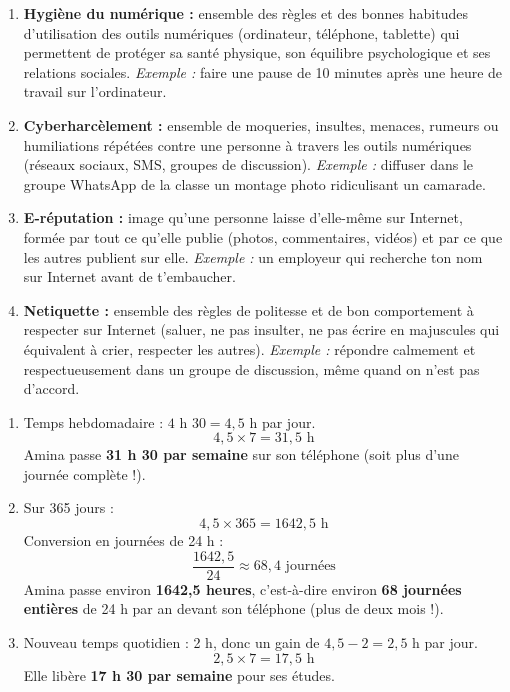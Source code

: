 \documentclass[11pt]{article}
\begin{document}
\begin{corrige}
\begin{enumerate}
\item \textbf{Hygiène du numérique :} ensemble des règles et des bonnes habitudes d'utilisation des outils numériques (ordinateur, téléphone, tablette) qui permettent de protéger sa santé physique, son équilibre psychologique et ses relations sociales. \emph{Exemple :} faire une pause de 10 minutes après une heure de travail sur l'ordinateur.
\item \textbf{Cyberharcèlement :} ensemble de moqueries, insultes, menaces, rumeurs ou humiliations répétées contre une personne à travers les outils numériques (réseaux sociaux, SMS, groupes de discussion). \emph{Exemple :} diffuser dans le groupe WhatsApp de la classe un montage photo ridiculisant un camarade.
\item \textbf{E-réputation :} image qu'une personne laisse d'elle-même sur Internet, formée par tout ce qu'elle publie (photos, commentaires, vidéos) et par ce que les autres publient sur elle. \emph{Exemple :} un employeur qui recherche ton nom sur Internet avant de t'embaucher.
\item \textbf{Netiquette :} ensemble des règles de politesse et de bon comportement à respecter sur Internet (saluer, ne pas insulter, ne pas écrire en majuscules qui équivalent à crier, respecter les autres). \emph{Exemple :} répondre calmement et respectueusement dans un groupe de discussion, même quand on n'est pas d'accord.
\end{enumerate}
\end{corrige}

\begin{corrige}
\begin{enumerate}
\item Temps hebdomadaire : $4\text{ h }30 = 4,5$ h par jour.
\[ 4,5 \times 7 = 31,5 \text{ h} \]
Amina passe \textbf{31 h 30 par semaine} sur son téléphone (soit plus d'une journée complète !).
\item Sur 365 jours :
\[ 4,5 \times 365 = 1642,5 \text{ h} \]
Conversion en journées de 24 h :
\[ \frac{1642,5}{24} \approx 68,4 \text{ journées} \]
Amina passe environ \textbf{1642,5 heures}, c'est-à-dire environ \textbf{68 journées entières} de 24 h par an devant son téléphone (plus de deux mois !).
\item Nouveau temps quotidien : 2 h, donc un gain de $4,5 - 2 = 2,5$ h par jour.
\[ 2,5 \times 7 = 17,5 \text{ h} \]
Elle libère \textbf{17 h 30 par semaine} pour ses études.
\end{enumerate}
\end{corrige}
\end{document}
